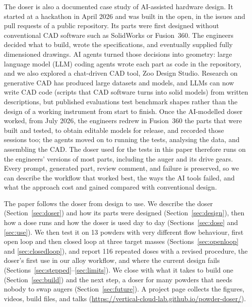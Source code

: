 \documentclass[twoside,twocolumn,9pt]{article}
\begin{document}
The doser is also a documented case study of AI-assisted hardware design. It started at a hackathon in April 2026 and was built in the open, in the issues and pull requests of a public repository.\cite{NoteRepository} Its parts were first designed without conventional CAD software such as SolidWorks or Fusion~360. The engineers decided what to build, wrote the specifications, and eventually supplied fully dimensioned drawings. AI agents turned those decisions into geometry: large language model (LLM) coding agents wrote each part as code in the repository, and we also explored a chat-driven CAD tool, Zoo Design Studio. Research on generative CAD has produced large datasets and models,\cite{Wu2021Deepcad,Willis2021Fusion,Seff2021Vitruvion,Xu2024Brepgen} and LLMs can now write CAD code (scripts that CAD software turns into solid models) from written descriptions,\cite{Alrashedy2025Generating,Badagabettu2024Query2cad,Jansen2023Words,Rios2023Text} but published evaluations test benchmark shapes rather than the design of a working instrument from start to finish. Once the AI-modelled doser worked, from July 2026, the engineers redrew in Fusion~360 the parts that were built and tested, to obtain editable models for release, and recorded those sessions too; the agents moved on to running the tests, analysing the data, and assembling the CAD. The doser used for the tests in this paper therefore runs on the engineers' versions of most parts, including the auger and its drive gears. Every prompt, generated part, review comment, and failure is preserved, so we can describe the workflow that worked best, the ways the AI tools failed, and what the approach cost and gained compared with conventional design.

The paper follows the doser from design to use. We describe the doser (Section~\ref{sec:doser}) and how its parts were designed (Section~\ref{sec:design}), then how a dose runs and how the doser is used day to day (Sections~\ref{sec:dose} and \ref{sec:use}). We then test it on 13 powders with very different flow behaviour, first open loop and then closed loop at three target masses (Sections~\ref{sec:openloop} and \ref{sec:closedloop}), and report 116 repeated doses with a revised procedure, the doser's first use in our alloy workflow, and where the current design fails (Sections~\ref{sec:stepped}--\ref{sec:limits}). We close with what it takes to build one (Section~\ref{sec:build}) and the next step, a doser for many powders that needs nobody to swap augers (Section~\ref{sec:future}). A project page collects the figures, videos, build files, and talks (\url{https://vertical-cloud-lab.github.io/powder-doser/}).
\end{document}
